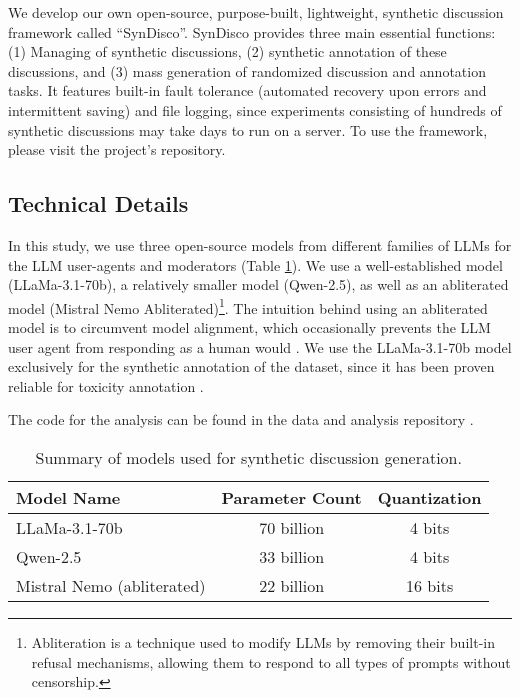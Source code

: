 We develop our own open-source, purpose-built, lightweight, synthetic discussion framework called “SynDisco”. SynDisco provides three main essential functions: (1) Managing of synthetic discussions, (2) synthetic annotation of these discussions, and (3) mass generation of randomized discussion and annotation tasks. It features built-in fault tolerance (automated recovery upon errors and intermittent saving) and file logging, since experiments consisting of hundreds of synthetic discussions may take days to run on a server. To use the framework, please visit the project's repository\projectlink.

\subsection{Technical Details}
\label{ssec:experimental:technical}

In this study, we use three open-source models from different families of \acp{LLM} for the \ac{LLM} user-agents and moderators (Table \ref{tab:models}). We use a well-established model (LLaMa-3.1-70b), a relatively smaller model (Qwen-2.5), as well as an abliterated model (Mistral Nemo Abliterated)\footnote{Abliteration is a technique used to modify \acp{LLM} by removing their built-in refusal mechanisms, allowing them to respond to all types of prompts without censorship.}. The intuition behind using an abliterated model is to circumvent model alignment, which occasionally prevents the \ac{LLM} user agent from responding as a human would \cite{Park2023GenerativeAI}. We use the LLaMa-3.1-70b model exclusively for the synthetic annotation of the dataset, since it has been proven reliable for toxicity annotation \cite{koh-etal-2024-llms}. 

The code for the analysis can be found in the data and analysis repository \analysislink.

\begin{table}[ht]
\centering
    \begin{tabular}{|l|c|c|}
        \hline
        \textbf{Model Name} & \textbf{Parameter Count} & \textbf{Quantization} \\
        \hline
        LLaMa-3.1-70b & 70 billion & 4 bits \\
        Qwen-2.5 & 33 billion & 4 bits \\
        Mistral Nemo (abliterated) & 22 billion & 16 bits\\
        \hline
    \end{tabular}
\caption{Summary of models used for synthetic discussion generation.}
\label{tab:models}
\end{table}

